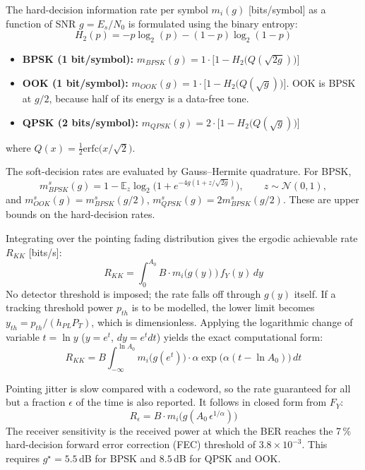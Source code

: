 The hard-decision information rate per symbol $m_i(g)$ [bits/symbol] as a function of SNR $g=E_s/N_0$ is formulated using the binary entropy:
\begin{equation}
H_2(p)=-p\log_2(p)-(1-p)\log_2(1-p)
\end{equation}
\begin{itemize}
\item \textbf{BPSK (1 bit/symbol):} $m_{BPSK}(g)=1\cdot\big[1-H_2\big(Q(\sqrt{2g})\big)\big]$
\item \textbf{OOK (1 bit/symbol):} $m_{OOK}(g)=1\cdot\big[1-H_2\big(Q(\sqrt{g})\big)\big]$. OOK is BPSK at $g/2$, because half of its energy is a data-free tone.
\item \textbf{QPSK (2 bits/symbol):} $m_{QPSK}(g)=2\cdot\big[1-H_2\big(Q(\sqrt{g})\big)\big]$
\end{itemize}
where $Q(x)=\frac12\mathrm{erfc}\big(x/\sqrt2\big)$.

The soft-decision rates are evaluated by Gauss--Hermite quadrature. For BPSK,
\[
m^{s}_{BPSK}(g)=1-\mathbb E_z\log_2\!\big(1+e^{-4g(1+z/\sqrt{2g})}\big),\qquad z\sim\mathcal N(0,1),
\]
and $m^s_{OOK}(g)=m^s_{BPSK}(g/2)$, $m^s_{QPSK}(g)=2m^s_{BPSK}(g/2)$. These are upper bounds on the hard-decision rates.

Integrating over the pointing fading distribution gives the ergodic achievable rate $R_{KK}$ [bits/s]:
\begin{equation}
R_{KK}=\int_{0}^{A_0}B\cdot m_i\big(g(y)\big)\,f_Y(y)\,dy
\end{equation}
No detector threshold is imposed; the rate falls off through $g(y)$ itself. If a tracking threshold power $p_{th}$ is to be modelled, the lower limit becomes $y_{th}=p_{th}/(h_{PL}P_T)$, which is dimensionless. Applying the logarithmic change of variable $t=\ln y$ ($y=e^t$, $dy=e^tdt$) yields the exact computational form:
\begin{equation}
R_{KK}=B\int_{-\infty}^{\ln A_0}m_i\big(g(e^t)\big)\cdot\alpha\exp\big(\alpha(t-\ln A_0)\big)\,dt
\end{equation}

Pointing jitter is slow compared with a codeword, so the rate guaranteed for all but a fraction $\epsilon$ of the time is also reported. It follows in closed form from $F_Y$:
\begin{equation}
R_\epsilon=B\cdot m_i\big(g(A_0\,\epsilon^{1/\alpha})\big)
\end{equation}
The receiver sensitivity is the received power at which the BER reaches the 7\,\% hard-decision forward error correction (FEC) threshold of $3.8\times10^{-3}$. This requires $g^\star=5.5$\,dB for BPSK and $8.5$\,dB for QPSK and OOK.

